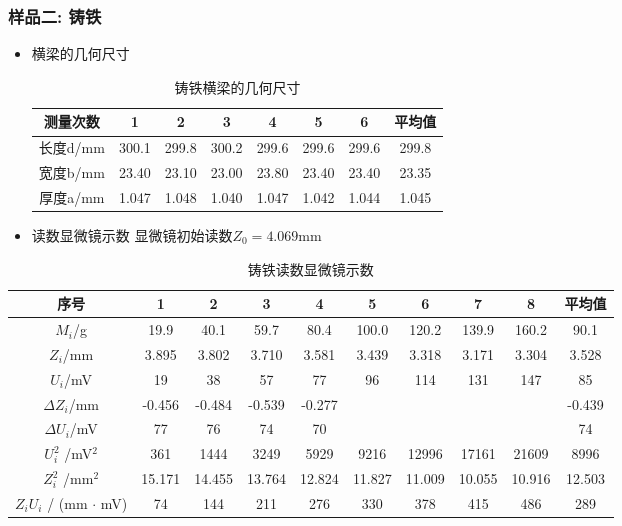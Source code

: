 \documentclass[zihao=5, UTF8]{article}
\theoremstyle{MyLineTheoremStyle} %
\theoremstyle{MyBlockTheoremStyle} %
\theoremstyle{MySubsubsectionStyle} %
\begin{document}
\subsubsection{样品二: 铸铁}
\begin{itemize}
    \item 横梁的几何尺寸
        \begin{table}[H]
        \centering
        \begin{tabular}{|c|c|c|c|c|c|c|c|} 
        \hline
        测量次数   & 1     & 2     & 3     & 4     & 5     & 6     & 平均值    \\ 
        \hline
        长度d/mm & 300.1 & 299.8 & 300.2 & 299.6 & 299.6 & 299.6 & 299.8  \\ 
        \hline
        宽度b/mm & 23.40 & 23.10 & 23.00 & 23.80 & 23.40 & 23.40 & 23.35  \\ 
        \hline
        厚度a/mm & 1.047 & 1.048 & 1.040  & 1.047 & 1.042 & 1.044 & 1.045  \\
        \hline
        \end{tabular}
        \caption{铸铁横梁的几何尺寸}
        \end{table}
    \item 读数显微镜示数
    显微镜初始读数$Z_0 = 4.069$mm
\end{itemize}
\begin{table}[H]
\centering
\begin{tabular}{|c|c|c|c|c|c|c|c|c|c|} 
\hline
序号                                & 1      & 2      & 3      & 4      & 5     & 6     & 7     & 8     & 平均值     \\ 
\hline
$M_i$/g          & 19.9   & 40.1   & 59.7   & 80.4   & 100.0  & 120.2  & 139.9  & 160.2  & 90.1    \\ 
\hline
$Z_i$/mm         & 3.895  & 3.802  & 3.710  & 3.581  & 3.439  & 3.318  & 3.171  & 3.304  & 3.528   \\ 
\hline
$U_i$/mV         & 19     & 38     & 57     & 77     & 96     & 114    & 131    & 147    & 85      \\ 
\hline
$\Delta Z_i$/mm   & -0.456 & -0.484 & -0.539 & -0.277 &        &        &        &        & -0.439  \\ 
\hline
$\Delta U_i$/mV   & 77     & 76     & 74     & 70     &        &        &        &        & 74      \\ 
\hline
$U_i^2$ /mV$^2$       & 361    & 1444   & 3249   & 5929   & 9216   & 12996  & 17161  & 21609  & 8996    \\ 
\hline
 $Z_i^2$ /mm$^2$       & 15.171 & 14.455 & 13.764 & 12.824 & 11.827 & 11.009 & 10.055 & 10.916 & 12.503  \\ 
\hline
$Z_iU_i$ / (mm $\cdot$ mV) & 74     & 144    & 211    & 276    & 330    & 378    & 415    & 486    & 289     \\
\hline
\end{tabular}
\caption{铸铁读数显微镜示数}
\end{table}
\end{document}
